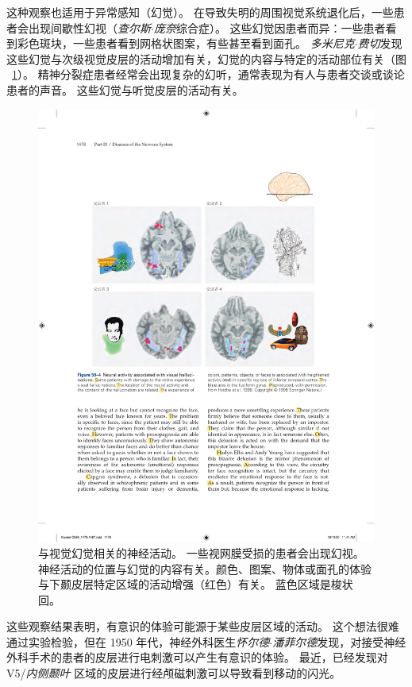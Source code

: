这种观察也适用于异常感知（幻觉）。
在导致失明的周围视觉系统退化后，一些患者会出现间歇性幻视（\textit{查尔斯$\cdot$庞奈}综合症）。
这些幻觉因患者而异：一些患者看到彩色斑块，一些患者看到网格状图案，有些甚至看到面孔。
\textit{多米尼克$\cdot$费切}发现这些幻觉与次级视觉皮层的活动增加有关，幻觉的内容与特定的活动部位有关（图 ~\ref{fig:59_4}）。
精神分裂症患者经常会出现复杂的幻听，通常表现为有人与患者交谈或谈论患者的声音。
这些幻觉与听觉皮层的活动有关。


\begin{figure}[htbp]
	\centering
	\includegraphics[width=1.0\linewidth]{chap59/fig_59_4}
	\caption{与视觉幻觉相关的神经活动。
		一些视网膜受损的患者会出现幻视。
		神经活动的位置与幻觉的内容有关。颜色、图案、物体或面孔的体验与下颞皮层特定区域的活动增强（红色）有关。
		蓝色区域是梭状回\cite{howard1998anatomy}。}
	\label{fig:59_4}
\end{figure}


这些观察结果表明，有意识的体验可能源于某些皮层区域的活动。
这个想法很难通过实验检验，但在 1950 年代，神经外科医生\textit{怀尔德$\cdot$潘菲尔德}发现，对接受神经外科手术的患者的皮层进行电刺激可以产生有意识的体验。
最近，已经发现对 V5/\textit{内侧颞叶} 区域的皮层进行经颅磁刺激可以导致看到移动的闪光。


